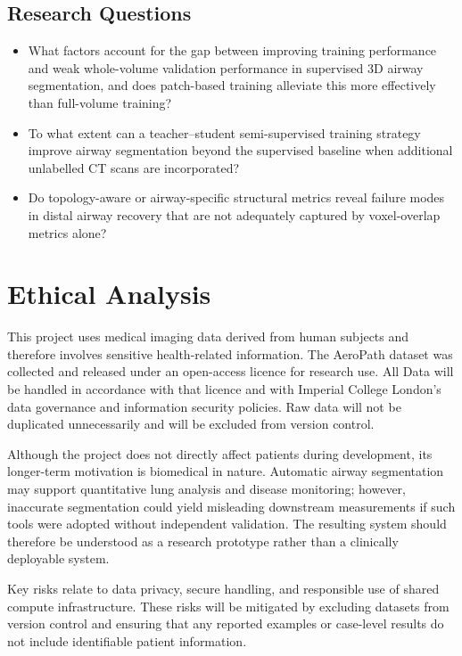 \documentclass[11pt,a4paper]{article}
\begin{document}
\subsection{Research Questions}
\begin{itemize}
    \item What factors account for the gap between improving training performance and weak whole-volume validation performance in supervised 3D airway segmentation, and does patch-based training alleviate this more effectively than full-volume training?
    \item To what extent can a teacher--student semi-supervised training strategy improve airway segmentation beyond the supervised baseline when additional unlabelled CT scans are incorporated?
    \item Do topology-aware or airway-specific structural metrics reveal failure modes in distal airway recovery that are not adequately captured by voxel-overlap metrics alone?
\end{itemize}

\section{Ethical Analysis}

This project uses medical imaging data derived from human subjects and therefore involves sensitive health-related information. The AeroPath dataset was collected and released under an open-access licence for research use. All Data will be handled in accordance with that licence and with Imperial College London's data governance and information security policies. Raw data will not be duplicated unnecessarily and will be excluded from version control.

Although the project does not directly affect patients during development, its longer-term motivation is biomedical in nature. Automatic airway segmentation may support quantitative lung analysis and disease monitoring; however, inaccurate segmentation could yield misleading downstream measurements if such tools were adopted without independent validation. The resulting system should therefore be understood as a research prototype rather than a clinically deployable system.

Key risks relate to data privacy, secure handling, and responsible use of shared compute infrastructure. These risks will be mitigated by excluding datasets from version control and ensuring that any reported examples or case-level results do not include identifiable patient information.
\end{document}
